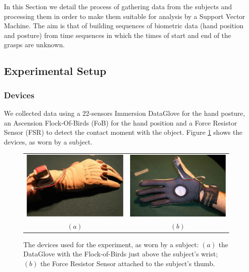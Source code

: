 In this Section we detail the process of gathering data from the
subjects and processing them in order to make them suitable for
analysis by a Support Vector Machine. The aim is that of building
sequences of biometric data (hand position and posture) from time
sequences in which the times of start and end of the grasps are
unknown.

\subsection{Experimental Setup}

\subsubsection*{Devices}

We collected data using a 22-sensors Immersion DataGlove for the hand
posture, an Ascension Flock-Of-Birds (FoB) for the hand position and a
Force Resistor Sensor (FSR) to detect the contact moment with the
object. Figure \ref{fig:devices} shows the devices, as worn by a
subject.

\begin{figure}[htbp]
  \begin{center}
    \begin{tabular}{cc}
      \includegraphics[width=0.45\linewidth]{devices1.eps} &
      \includegraphics[width=0.45\linewidth]{devices2.eps} \\
      $(a)$ & $(b)$
    \end{tabular}
    \caption{The devices used for the experiment, as worn by a
    subject: $(a)$ the DataGlove with the Flock-of-Birds just above the
    subject's wrist; $(b)$ the Force Resistor Sensor attached to the
    subject's thumb.}
    \label{fig:devices}
  \end{center}
\end{figure}

